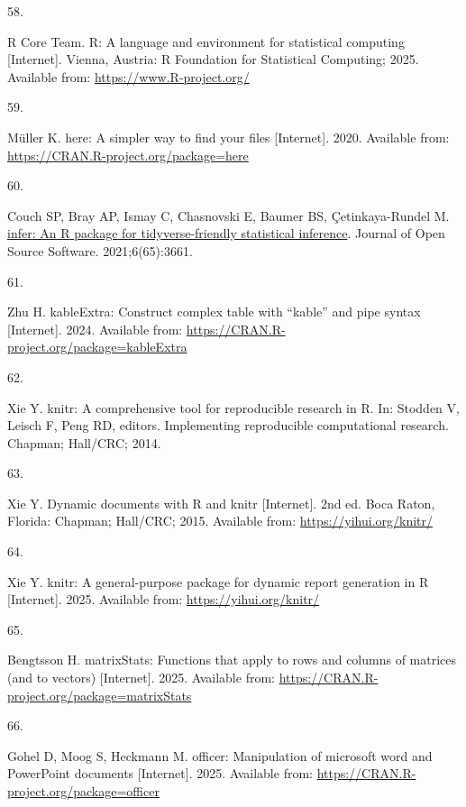 \documentclass[
]{article}
\newlength{\cslhangindent}
\newlength{\csllabelwidth}
\newenvironment{CSLReferences}[2] %
 {\begin{list}{}{%
  \setlength{\itemindent}{0pt}
  \setlength{\leftmargin}{0pt}
  \setlength{\parsep}{0pt}
  \ifodd #1
   \setlength{\leftmargin}{\cslhangindent}
   \setlength{\itemindent}{-1\cslhangindent}
  \fi
  \setlength{\itemsep}{#2\baselineskip}}}
 {\end{list}}
\newcommand{\CSLLeftMargin}[1]{\parbox[t]{\csllabelwidth}{\strut#1\strut}}
\newcommand{\CSLRightInline}[1]{\parbox[t]{\linewidth - \csllabelwidth}{\strut#1\strut}}
\begin{document}
\begin{CSLReferences}{0}{1}
\CSLLeftMargin{58. }%
\CSLRightInline{R Core Team. {R}: A language and environment for statistical computing {[}Internet{]}. Vienna, Austria: R Foundation for Statistical Computing; 2025. Available from: \url{https://www.R-project.org/}}

\CSLLeftMargin{59. }%
\CSLRightInline{Müller K. {here}: A simpler way to find your files {[}Internet{]}. 2020. Available from: \url{https://CRAN.R-project.org/package=here}}

\CSLLeftMargin{60. }%
\CSLRightInline{Couch SP, Bray AP, Ismay C, Chasnovski E, Baumer BS, Çetinkaya-Rundel M. \href{https://doi.org/10.21105/joss.03661}{{infer}: An {R} package for tidyverse-friendly statistical inference}. Journal of Open Source Software. 2021;6(65):3661. }

\CSLLeftMargin{61. }%
\CSLRightInline{Zhu H. {kableExtra}: Construct complex table with {``{kable}''} and pipe syntax {[}Internet{]}. 2024. Available from: \url{https://CRAN.R-project.org/package=kableExtra}}

\CSLLeftMargin{62. }%
\CSLRightInline{Xie Y. {knitr}: A comprehensive tool for reproducible research in {R}. In: Stodden V, Leisch F, Peng RD, editors. Implementing reproducible computational research. Chapman; Hall/CRC; 2014. }

\CSLLeftMargin{63. }%
\CSLRightInline{Xie Y. Dynamic documents with {R} and knitr {[}Internet{]}. 2nd ed. Boca Raton, Florida: Chapman; Hall/CRC; 2015. Available from: \url{https://yihui.org/knitr/}}

\CSLLeftMargin{64. }%
\CSLRightInline{Xie Y. {knitr}: A general-purpose package for dynamic report generation in {R} {[}Internet{]}. 2025. Available from: \url{https://yihui.org/knitr/}}

\CSLLeftMargin{65. }%
\CSLRightInline{Bengtsson H. {matrixStats}: Functions that apply to rows and columns of matrices (and to vectors) {[}Internet{]}. 2025. Available from: \url{https://CRAN.R-project.org/package=matrixStats}}

\CSLLeftMargin{66. }%
\CSLRightInline{Gohel D, Moog S, Heckmann M. {officer}: Manipulation of microsoft word and PowerPoint documents {[}Internet{]}. 2025. Available from: \url{https://CRAN.R-project.org/package=officer}}


\end{CSLReferences}
\end{document}

